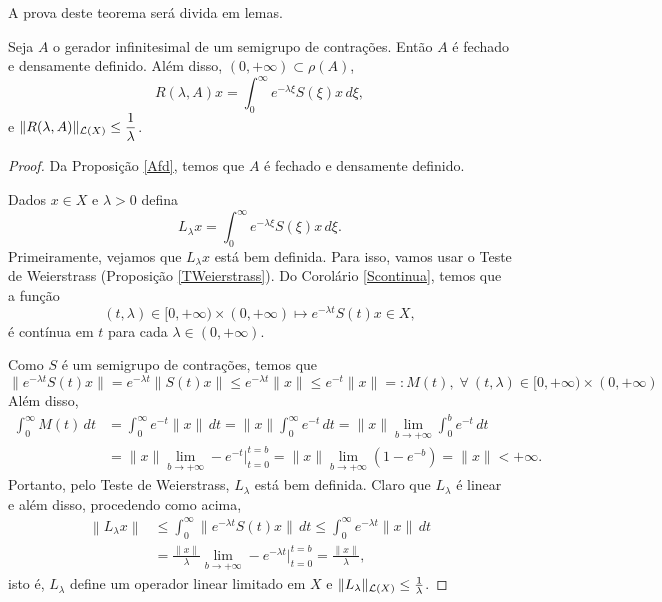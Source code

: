 A prova deste teorema será divida em  lemas.

\begin{lemma}
Seja $A$ o gerador infinitesimal de um semigrupo de contrações. Então $A$ é fechado e densamente definido. Além disso, $(0,+\infty)\subset \rho(A)$, 
\[R(\lambda,A)x=\displaystyle\int_0^\infty e^{-\lambda \xi}S(\xi)x\, d\xi,\] 
e $\|R(\lambda, A)\|_{\mathcal{L}(X)}\leq \displaystyle\frac{1}{\lambda}$.
\end{lemma}
\begin{proof} Da Proposição \ref{Afd}, temos que $A$ é fechado e densamente definido.

Dados $x\in X$ e $\lambda>0$ defina
\begin{equation*}
L_\lambda x =\int_0^\infty e^{-\lambda \xi}S(\xi)x\, d\xi.
\end{equation*}
Primeiramente, vejamos que $L_\lambda x$ está bem definida. 
Para isso, vamos usar o Teste de Weierstrass
(Proposição \ref{TWeierstrass}). Do Corolário \ref{Scontinua}, temos que a função
\begin{equation*}
(t,\lambda)\in [0,+\infty)\times (0,+\infty)\longmapsto e^{-\lambda t}S(t)x\in  X,
\end{equation*}
é contínua em $t$ para cada $\lambda\in (0,+\infty)$. 

Como $S$ é um semigrupo de contrações, temos que
\begin{equation*}
\|e^{-\lambda t}S(t)x\| =e^{-\lambda t}\|S(t)x\|\leq e^{-\lambda t}\|x\|
\leq e^{-t}\|x\| =:M(t), 
\; \forall\ (t,\lambda)\in [0,+\infty)\times (0,+\infty)
\end{equation*}
Além disso, 
\begin{align*}
 \int_0^\infty M(t)\, dt& =\int_0^\infty e^{-t}\|x\|\, dt
=\|x\| \int_0^\infty e^{- t}\, dt 
=\|x\|\lim_{b\to +\infty} \int_0^b e^{-t}\, dt\\
& =\|x\|\lim_{b\to +\infty}-e^{-t}\Big\vert_{t=0}^{t=b} =\|x\|\lim_{b\to +\infty}\left(1-e^{-b}\right)={\|x\|}<+\infty.
\end{align*}
Portanto, pelo Teste de Weierstrass, $L_\lambda$ está bem definida. Claro que $L_\lambda$ é linear e além disso, procedendo como acima, 
\begin{align*}
\left\|L_\lambda x\right\|& \leq \int_0^\infty\|e^{-\lambda t}S(t)x\|\,dt\leq
\int_0^\infty e^{-\lambda t}\|x\|\,dt\\
& = \frac{\|x\|}{\lambda}\lim_{b\to +\infty}-e^{-\lambda t}\Big\vert_{t=0}^{t=b}
=\frac{\|x\|}{\lambda},
\end{align*}
isto é, $L_\lambda$ define um operador linear limitado em $X$ e 
$\|L_\lambda\|_{\mathcal{L}(X)}\leq \frac{1}{\lambda}$.


\end{proof}
